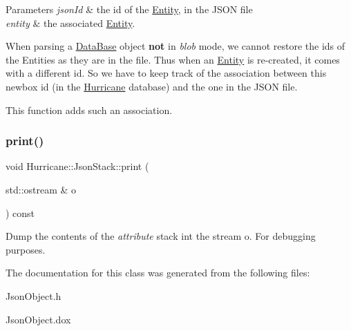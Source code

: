 \begin{DoxyParams}{Parameters}
{\em json\+Id} & the {\ttfamily id} of the \hyperlink{classHurricane_1_1Entity}{Entity}, in the J\+S\+ON file \\
\hline
{\em entity} & the associated \hyperlink{classHurricane_1_1Entity}{Entity}.\\
\hline
\end{DoxyParams}
When parsing a \hyperlink{classHurricane_1_1DataBase}{Data\+Base} object {\bfseries not} in {\itshape blob} mode, we cannot restore the ids of the Entities as they are in the file. Thus when an \hyperlink{classHurricane_1_1Entity}{Entity} is re-\/created, it comes with a different id. So we have to keep track of the association between this newbox id (in the \hyperlink{namespaceHurricane}{Hurricane} database) and the one in the J\+S\+ON file.

This function adds such an association. \mbox{\label{classHurricane_1_1JsonStack_a7e0364c8868b8396db10399a855b8aa1}} 
\subsubsection{\texorpdfstring{print()}{print()}}
{\footnotesize\ttfamily void Hurricane\+::\+Json\+Stack\+::print (\begin{DoxyParamCaption}\item[{std\+::ostream \&}]{o }\end{DoxyParamCaption}) const}

Dump the contents of the {\itshape attribute} stack int the stream {\ttfamily o}. For debugging purposes. 

The documentation for this class was generated from the following files\+:\begin{DoxyCompactItemize}
\item 
Json\+Object.\+h\item 
Json\+Object.\+dox\end{DoxyCompactItemize}
